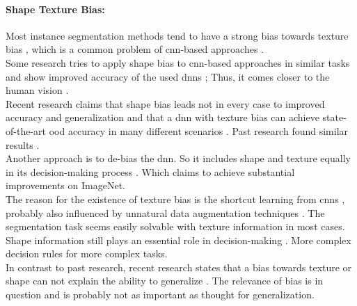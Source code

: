 		\paragraph{Shape Texture Bias:} Most instance segmentation methods tend to have a strong bias towards texture bias \cite{Theodoridis2022}, which is a common problem of \ac{cnn}-based approaches \cite{Geirhos2022}\cite{Baker2018}\cite{Tabak2023}.\\
		Some research tries to apply shape bias to \ac{cnn}-based approaches in similar tasks and show improved accuracy of the used \ac{dnn}s \cite{Geirhos2022}\cite{Hermann2020}; Thus, it comes closer to the human vision \cite{Geirhos2020}\cite{Mohla2022}\cite{Baker2020}.\\
		Recent research claims that shape bias leads not in every case to improved accuracy and generalization and that a \ac{dnn} with texture bias can achieve state-of-the-art \ac{ood} accuracy in many different scenarios \cite{Qiu2024}. Past research found similar results \cite{Brochu2019}.\\
		Another approach is to de-bias the \ac{dnn}. So it includes shape and texture equally in its decision-making process \cite{Li2021}\cite{Co2021}\cite{Chung2023}. Which claims to achieve substantial improvements on ImageNet. \\
		The reason for the existence of texture bias is the shortcut learning from \ac{cnn}s \cite{Geirhos2020}, probably also influenced by unnatural data augmentation techniques \cite{Hermann2020}. The segmentation task seems easily solvable with texture information in most cases. Shape information still plays an essential role in decision-making \cite{Tabak2023}. More complex decision rules for more complex tasks.\\
		In contrast to past research, recent research states that a bias towards texture or shape can not explain the ability to generalize \cite{Gavrikov2024}. The relevance of bias is in question and is probably not as important as thought for generalization. %
